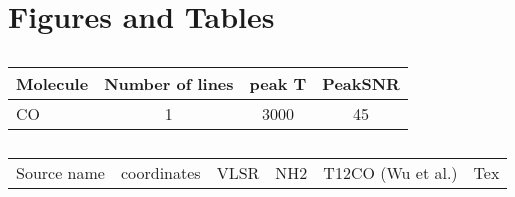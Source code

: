 \section{Figures and Tables}
\begin{table}
\caption{}
\begin{tabular}{ l c c c }
Molecule & Number of lines & peak T & PeakSNR\\
\hline
CO       & 1               & 3000   & 45      \\

\hline
\end{tabular}
\end{table}


\begin{table}
\caption{}
\begin{tabular}{ l c c c c c}
Source name & coordinates & VLSR & NH2 & T12CO (Wu et al.)& Tex \\
\end{tabular}
\end{table}
 
  
  
  
  
  
  
  
  
  
  
  
  
  
  
  
  
  
  
  
  
  
  